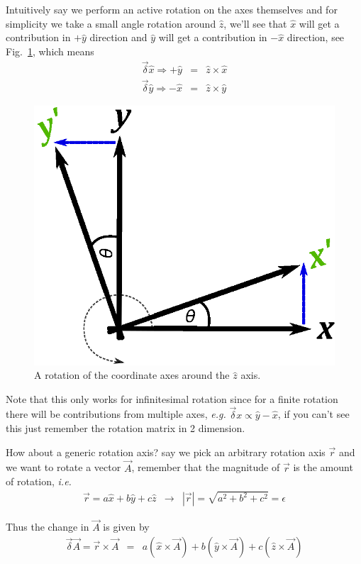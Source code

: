 \documentclass[aps,preprint,preprintnumbers,nofootinbib,showpacs,prd]{revtex4-1}
\newcommand{\ie}{{\it i.e.} }
\newcommand{\eg}{{\it e.g.} }
\newcommand{\nbea}{\begin{eqnarray*}}
\newcommand{\neea}{\end{eqnarray*}}
\begin{document}
Intuitively say we perform an active rotation on the axes themselves and for simplicity we take a small angle rotation around $\hat z$, we'll see that $\hat x$ will get a contribution in $+\hat y$ direction and $\hat y$ will get a contribution in $-\hat x$ direction, see Fig.~\ref{fig:inf-rot}, which means
\nbea
\vec \delta \hat x \Rightarrow +\hat y & = & \hat z \times \hat x \\
\vec \delta \hat y \Rightarrow -\hat x & = & \hat z \times \hat y
\neea
%
\begin{figure}
\begin{center}
  \includegraphics[scale=0.8]{inf-rot.eps}
\end{center}
  \caption{\label{fig:inf-rot}
A rotation of the coordinate axes around the $\hat z$ axis.}
\end{figure}
%
Note that this only works for infinitesimal rotation since for a finite rotation there will be contributions from multiple axes, \eg $\vec \delta x \propto \hat y - \hat x$, if you can't see this just remember the rotation matrix in 2 dimension.

How about a generic rotation axis? say we pick an arbitrary rotation axis $\vec r$ and we want to rotate a vector $\vec A$, remember that the magnitude of $\vec r$ is the amount of rotation, \ie
\nbea
\vec r = a \hat x + b \hat y + c \hat z &\longrightarrow& |\vec r| = \sqrt{a^2 + b^2 + c^2} = \epsilon
\neea

Thus the change in $\vec A$ is given by
\nbea
\vec \delta \vec A = \vec r \times \vec A & = & a (\hat x \times \vec A) + b (\hat y \times \vec A) + c (\hat z \times \vec A)
\neea
\end{document}
